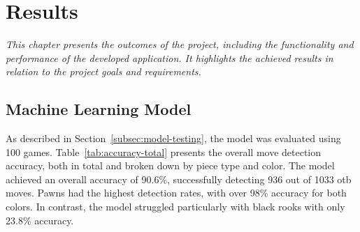 \chapter{Results}


\begin{center}
    \textit{This chapter presents the outcomes of the project, including the functionality and performance of the developed application. It highlights the achieved results in relation to the project goals and requirements.}
\end{center}

\section{Machine Learning Model}

As described in Section~\ref{subsec:model-testing}, the model was evaluated using 100 games. Table~\ref{tab:accuracy-total} presents the overall move detection accuracy, both in total and broken down by piece type and color. The model achieved an overall accuracy of 90.6\%, successfully detecting 936 out of 1033 \gls{otb} moves. Pawns had the highest detection rates, with over 98\% accuracy for both colors. In contrast, the model struggled particularly with black rooks with only 23.8\% accuracy.

\newpage

